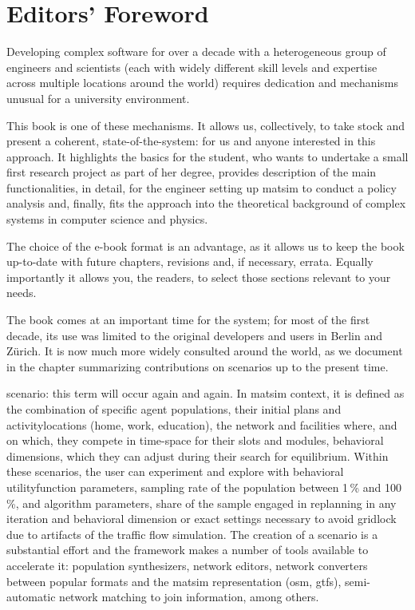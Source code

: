 \chapter*{Editors' Foreword}


Developing complex software for over a decade with a heterogeneous group of engineers and scientists (each with widely different skill levels and expertise across multiple locations around the world) requires dedication and mechanisms unusual for a university environment. 

This book is one of these mechanisms. It allows us, collectively, to take stock and present a coherent, state-of-the-system: for us and anyone interested in this approach. It highlights the basics for the student, who wants to undertake a small first research project as part of her degree, provides description of the main functionalities, in detail, for the engineer setting up \gls{matsim} to conduct a policy analysis and, finally, fits the approach into the theoretical background of complex systems in computer science and physics. 

The choice of the e-book format is an advantage, as it allows us to keep the book up-to-date with future chapters, revisions and, if necessary, errata. Equally importantly it allows you, the readers, to select those sections relevant to your needs. 

The book comes at an important time for the system; for most of the first decade, its use was limited to the original developers and users in Berlin and Zürich. It is now much more widely consulted around the world, as we document in the chapter summarizing contributions on \glspl{scenario} up to the present time. 

\Gls{scenario}: this term will occur again and again. In \gls{matsim} context, it is defined as the combination of specific agent populations, their initial \glspl{plan} and \glspl{activitylocation} (home, work, education), the network and facilities where, and on which, they compete in time-space for their slots and modules, \ie behavioral dimensions, which they can adjust during their search for equilibrium. Within these \glspl{scenario}, the user can experiment and explore with behavioral \gls{utilityfunction} parameters, sampling rate of the population between 1\,\% and 100\,\%, and algorithm parameters, \ie share of the sample engaged in \gls{replanning} in any \gls{iteration} and behavioral dimension or exact settings necessary to avoid gridlock due to artifacts of the traffic flow simulation. The creation of a \gls{scenario} is a substantial effort and the \gls{framework} makes a number of tools available to accelerate it: population synthesizers, network editors, network converters between popular formats and the \gls{matsim} representation (\eg \gls{osm}, \gls{gtfs}), semi-automatic network matching to join information, among others.

